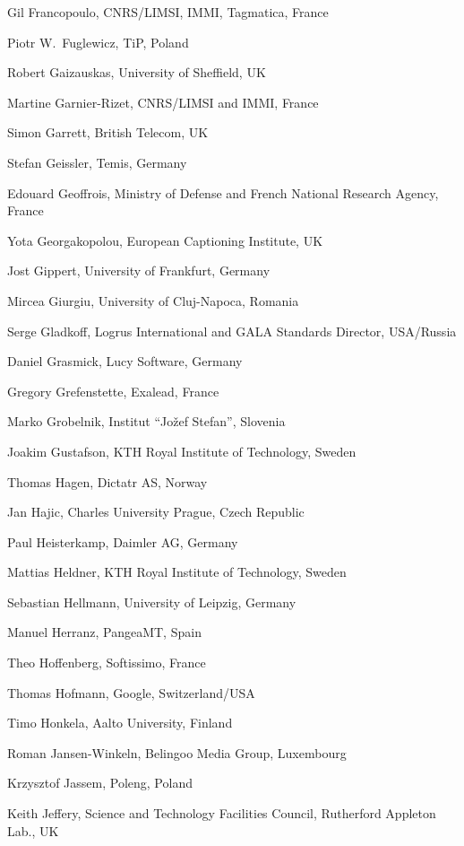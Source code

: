 \documentclass[10pt, plain]{../../metanetpaper}
\begin{document}
\begin{multicols}{3}
\begin{small}
\begin{enumerate}
{      \item Gil Francopoulo, CNRS/LIMSI, IMMI, Tagmatica, France
      \item Piotr W.~Fuglewicz, TiP, Poland
      \item Robert Gaizauskas, University of Sheffield, UK
      \item Martine Garnier-Rizet, CNRS/LIMSI and IMMI, France
      \item Simon Garrett, British Telecom, UK
      \item Stefan Geissler, Temis, Germany
      \item Edouard Geoffrois, Ministry of Defense and French National Research Agency, France
      \item Yota Georgakopolou, European Captioning Institute, UK
      \item Jost Gippert, University of Frankfurt, Germany
      \item Mircea Giurgiu, University of Cluj-Napoca, Romania
      \item Serge Gladkoff, Logrus International and GALA Standards Director, USA/Russia
      \item Daniel Grasmick, Lucy Software, Germany
      \item Gregory Grefenstette, Exalead, France
      \item Marko Grobelnik, Institut ``Jožef Stefan'', Slovenia
      \item Joakim Gustafson, KTH Royal Institute of Technology, Sweden
      \item Thomas Hagen, Dictatr AS, Norway
      \item Jan Hajic, Charles University Prague, Czech Republic
      \item Paul Heisterkamp, Daimler AG, Germany
      \item Mattias Heldner, KTH Royal Institute of Technology, Sweden
      \item Sebastian Hellmann, University of Leipzig, Germany
      \item Manuel Herranz, PangeaMT, Spain
      \item Theo Hoffenberg, Softissimo, France
      \item Thomas Hofmann, Google, Switzerland/USA
      \item Timo Honkela, Aalto University, Finland
      \item Roman Jansen-Winkeln, Belingoo Media Group, Luxembourg
      \item Krzysztof Jassem, Poleng, Poland
      \item Keith Jeffery, Science and Technology Facilities Council, Rutherford Appleton Lab., UK
}
\end{enumerate}
\end{small}
\end{multicols}
\end{document}
